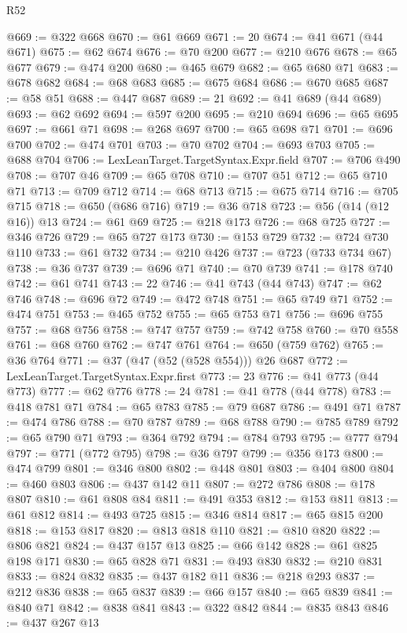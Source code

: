\begin{lexlean}{R52}
\begin{coremodule}
@669 := @322 @668
@670 := @61 @669
@671 := 20
@674 := @41 @671 (@44 @671)
@675 := @62 @674
@676 := @70 @200
@677 := @210 @676
@678 := @65 @677
@679 := @474 @200
@680 := @465 @679
@682 := @65 @680 @71
@683 := @678 @682
@684 := @68 @683
@685 := @675 @684
@686 := @670 @685
@687 := @58 @51
@688 := @447 @687
@689 := 21
@692 := @41 @689 (@44 @689)
@693 := @62 @692
@694 := @597 @200
@695 := @210 @694
@696 := @65 @695
@697 := @661 @71
@698 := @268 @697
@700 := @65 @698 @71
@701 := @696 @700
@702 := @474 @701
@703 := @70 @702
@704 := @693 @703
@705 := @688 @704
@706 := LexLeanTarget.TargetSyntax.Expr.field
@707 := @706 @490
@708 := @707 @46
@709 := @65 @708
@710 := @707 @51
@712 := @65 @710 @71
@713 := @709 @712
@714 := @68 @713
@715 := @675 @714
@716 := @705 @715
@718 := @650 (@686 @716)
@719 := @36 @718
@723 := @56 (@14 (@12 @16)) @13
@724 := @61 @69
@725 := @218 @173
@726 := @68 @725
@727 := @346 @726
@729 := @65 @727 @173
@730 := @153 @729
@732 := @724 @730 @110
@733 := @61 @732
@734 := @210 @426
@737 := @723 (@733 @734 @67)
@738 := @36 @737
@739 := @696 @71
@740 := @70 @739
@741 := @178 @740
@742 := @61 @741
@743 := 22
@746 := @41 @743 (@44 @743)
@747 := @62 @746
@748 := @696 @72
@749 := @472 @748
@751 := @65 @749 @71
@752 := @474 @751
@753 := @465 @752
@755 := @65 @753 @71
@756 := @696 @755
@757 := @68 @756
@758 := @747 @757
@759 := @742 @758
@760 := @70 @558
@761 := @68 @760
@762 := @747 @761
@764 := @650 (@759 @762)
@765 := @36 @764
@771 := @37 (@47 (@52 (@528 @554))) @26 @687
@772 := LexLeanTarget.TargetSyntax.Expr.first
@773 := 23
@776 := @41 @773 (@44 @773)
@777 := @62 @776
@778 := 24
@781 := @41 @778 (@44 @778)
@783 := @418 @781 @71
@784 := @65 @783
@785 := @79 @687
@786 := @491 @71
@787 := @474 @786
@788 := @70 @787
@789 := @68 @788
@790 := @785 @789
@792 := @65 @790 @71
@793 := @364 @792
@794 := @784 @793
@795 := @777 @794
@797 := @771 (@772 @795)
@798 := @36 @797
@799 := @356 @173
@800 := @474 @799
@801 := @346 @800
@802 := @448 @801
@803 := @404 @800
@804 := @460 @803
@806 := @437 @142 @11
@807 := @272 @786
@808 := @178 @807
@810 := @61 @808 @84
@811 := @491 @353
@812 := @153 @811
@813 := @61 @812
@814 := @493 @725
@815 := @346 @814
@817 := @65 @815 @200
@818 := @153 @817
@820 := @813 @818 @110
@821 := @810 @820
@822 := @806 @821
@824 := @437 @157 @13
@825 := @66 @142
@828 := @61 @825 @198 @171
@830 := @65 @828 @71
@831 := @493 @830
@832 := @210 @831
@833 := @824 @832
@835 := @437 @182 @11
@836 := @218 @293
@837 := @212 @836
@838 := @65 @837
@839 := @66 @157
@840 := @65 @839
@841 := @840 @71
@842 := @838 @841
@843 := @322 @842
@844 := @835 @843
@846 := @437 @267 @13

\end{coremodule}
\end{lexlean}
